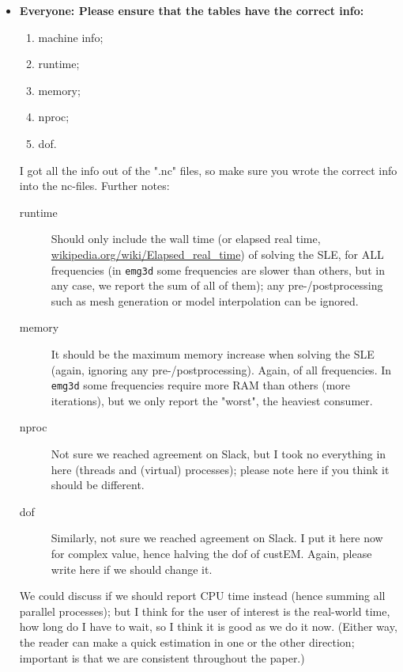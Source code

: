 \documentclass[
    paper,
  ]{geophysics}
\newcommand{\emg}[2]{\texttt{emg#1#2}\xspace}
\newcommand{\imycom}[2][]{\todo[inline]{\textbf{\uppercase{[#1]}}:~#2}}
\newcommand{\itodo}[1]{\todo[inline]{\sffamily #1}}
\begin{document}
\begin{itemize}
    \item  {\color{red}\bfseries Everyone: Please ensure that the tables have the correct info:}
      \begin{enumerate}
          \item machine info;
          \item runtime;
          \item memory;
          \item nproc;
          \item dof.
      \end{enumerate}
    I got all the info out of the ".nc" files, so make sure you wrote the correct info into the nc-files. Further notes:
      \begin{description}
        \item[runtime] Should only include the wall time (or elapsed real time, \href{https://en.wikipedia.org/wiki/Elapsed_real_time}{wikipedia.org/\-wiki/\-Elapsed\-\_real\-\_time}) of solving the SLE, for ALL frequencies (in \emg3d some frequencies are slower than others, but in any case, we report the sum of all of them); any pre-/postprocessing such as mesh generation or model interpolation can be ignored.
        \item[memory] It should be the maximum memory increase when solving the SLE (again, ignoring any pre-/postprocessing). Again, of all frequencies. In \emg3d some frequencies require more RAM than others (more iterations), but we only report the "worst", the heaviest consumer.
        \item[nproc] Not sure we reached agreement on Slack, but I took no everything in here (threads and (virtual) processes); please note here if you think it should be different.
        \item[dof] Similarly, not sure we reached agreement on Slack. I put it here now for complex value, hence halving the dof of custEM. Again, please write here if we should change it.
    \end{description}
    We could discuss if we should report CPU time instead (hence summing all parallel processes); but I think for the user of interest is the real-world time, how long do I have to wait, so I think it is good as we do it now. (Either way, the reader can make a quick estimation in one or the other direction; important is that we are consistent throughout the paper.)
    \imycom[RR]{Agreed.}
\end{itemize}
\itodo{\hfill$\Uparrow$\hfill$\Uparrow$\hfill List of things ToDo, Notes, etc\hfill$\Uparrow$\hfill$\Uparrow$\hfill~}
\newpage
\end{document}
